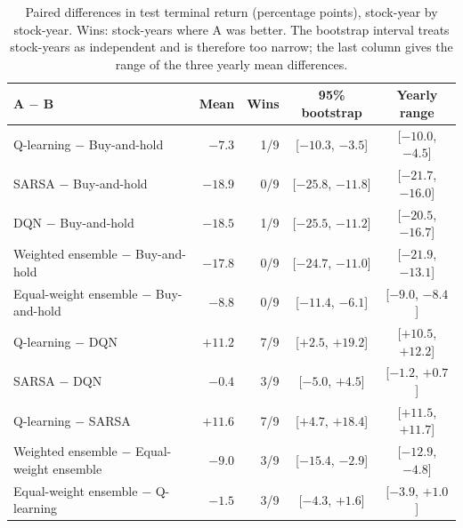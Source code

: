 \begin{table}[t]
\centering
\caption{Paired differences in test terminal return (percentage points), stock-year by stock-year. Wins: stock-years where A was better. The bootstrap interval treats stock-years as independent and is therefore too narrow; the last column gives the range of the three yearly mean differences.}
\label{tab:paired}
\small
\begin{tabular}{lrrcc}
\toprule
A $-$ B & Mean & Wins & 95\% bootstrap & Yearly range \\
\midrule
Q-learning $-$ Buy-and-hold & $-7.3$ & 1/9 & [$-10.3$, $-3.5$] & [$-10.0$, $-4.5$] \\
SARSA $-$ Buy-and-hold & $-18.9$ & 0/9 & [$-25.8$, $-11.8$] & [$-21.7$, $-16.0$] \\
DQN $-$ Buy-and-hold & $-18.5$ & 1/9 & [$-25.5$, $-11.2$] & [$-20.5$, $-16.7$] \\
Weighted ensemble $-$ Buy-and-hold & $-17.8$ & 0/9 & [$-24.7$, $-11.0$] & [$-21.9$, $-13.1$] \\
Equal-weight ensemble $-$ Buy-and-hold & $-8.8$ & 0/9 & [$-11.4$, $-6.1$] & [$-9.0$, $-8.4$] \\
Q-learning $-$ DQN & $+11.2$ & 7/9 & [$+2.5$, $+19.2$] & [$+10.5$, $+12.2$] \\
SARSA $-$ DQN & $-0.4$ & 3/9 & [$-5.0$, $+4.5$] & [$-1.2$, $+0.7$] \\
Q-learning $-$ SARSA & $+11.6$ & 7/9 & [$+4.7$, $+18.4$] & [$+11.5$, $+11.7$] \\
Weighted ensemble $-$ Equal-weight ensemble & $-9.0$ & 3/9 & [$-15.4$, $-2.9$] & [$-12.9$, $-4.8$] \\
Equal-weight ensemble $-$ Q-learning & $-1.5$ & 3/9 & [$-4.3$, $+1.6$] & [$-3.9$, $+1.0$] \\
\bottomrule
\end{tabular}
\end{table}
